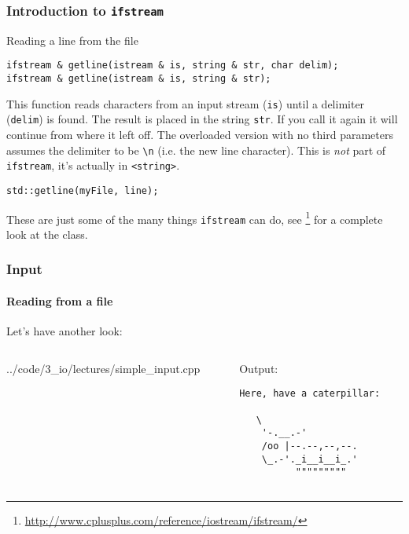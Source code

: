 \documentclass{beamer}
\begin{document}
\begin{frame}[fragile]
  \frametitle{Introduction to \texttt{ifstream}}


	\begin{block}{Reading a line from the file}
  	\begin{lstlisting}[aboveskip=0pt]
ifstream & getline(istream & is, string & str, char delim);
ifstream & getline(istream & is, string & str);
  	\end{lstlisting}
  	This function reads characters from an input stream (\texttt{is}) until a delimiter (\texttt{delim}) is found.  The result is placed in the string \texttt{str}.  If you call it again it will continue from where it left off.
  	\newline\pause
  	The overloaded version with no third parameters assumes the delimiter to be \texttt{\textbackslash{}n} (i.e. the new line character).
  	\newline\pause
  	This is \textit{not} part of \texttt{ifstream}, it's actually in \texttt{<string>}.
  	\begin{lstlisting}[belowskip=0pt]
  std::getline(myFile, line);
  	\end{lstlisting}
  \end{block}
  
  These are just some of the many things \texttt{ifstream} can do, see \footnote{\url{http://www.cplusplus.com/reference/iostream/ifstream/}} for a complete look at the class.

\end{frame}

\begin{frame}[fragile]
	\frametitle{Input}
	\framesubtitle{Reading from a file}
	
	Let's have another look:
	\begin{columns}[t]
	  \begin{column}[T]{0.5\textwidth}
    		{../code/3_io/lectures/simple_input.cpp}
		\end{column}
		\begin{column}[T]{0.5\textwidth}
		  Output:
			\begin{verbatim}Here, have a caterpillar:
						
   \
    '-.__.-'
    /oo |--.--,--,--.
    \_.-'._i__i__i_.'
          """""""""
		\end{verbatim}
		\end{column}
	\end{columns}
\end{frame}
\end{document}
